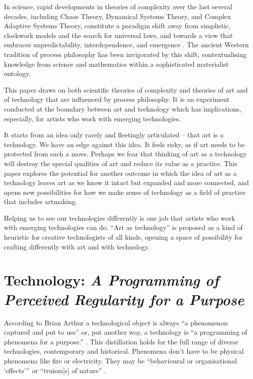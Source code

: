 \documentclass[letterpaper]{article}
\begin{document}
    In science, rapid developments in theories of complexity over the last several decades, including Chaos Theory, Dynamical Systems Theory, and Complex Adaptive Systems Theory, constitute a paradigm shift away from simplistic, clockwork models and the search for universal laws, and towards a view that embraces unpredictability, interdependence, and emergence \citep{StengersOrdrOtOfChs1984}. The ancient Western tradition of process philosophy \citep{SeibtStnfrdEncyclpdPrcssPhlsphy1974} has been invigorated by this shift, contextualising knowledge from science and mathematics within a sophisticated materialist ontology.
    
    This paper draws on both scientific theories of complexity and theories of art and of technology that are influenced by process philosophy. It is an experiment conducted at the boundary between art and technology which has implications, especially, for artists who work with emerging technologies.
    
    It starts from an idea only rarely \citep[pp.74–75]{SauvagnarguesArtmchns2016} and fleetingly \citep[p.202]{ZepkeOSullivanDlzCntmprryArt2010} articulated – that art is a technology. We have an edge against this idea. It feels risky, as if art needs to be protected from such a move. Perhaps we fear that thinking of art as a technology will destroy the special qualities of art and reduce its value as a practice. This paper explores the potential for another outcome in which the idea of art as a technology leaves art as we know it intact but expanded and more connected, and opens new possibilities for how we make sense of technology as a field of practice that includes artmaking. 
    
    Helping us to see our technologies differently is one job that artists who work with emerging technologies can do. “Art as technology” is proposed as a kind of heuristic for creative technologists of all kinds, opening a space of possibility for crafting differently with art and with technology.

\section{Technology: \emph{A Programming of Perceived Regularity for a Purpose}} 

    According to Brian Arthur a technological object is always “a phenomenon captured and put to use” \citep[p.53]{theNatureOfTechnology2009} or, put another way, a technology is “a programming of phenomena for a purpose.” \citep[p.53]{theNatureOfTechnology2009}. This distillation holds for the full range of diverse technologies, contemporary and historical. Phenomena don't have to be physical phenomena like fire or electricity. They may be “behavioural or organisational ‘effects’” \citep[p.55]{theNatureOfTechnology2009} or “truism[s] of nature” \citep[p.45]{theNatureOfTechnology2009}.
\end{document}
